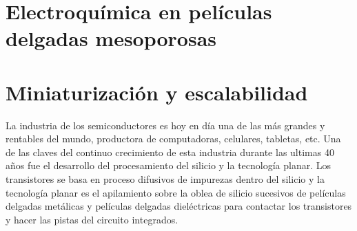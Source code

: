\section{Electroquímica en películas delgadas mesoporosas}
	
\section{Miniaturización y escalabilidad}\label{sec:microfabricacion}\label{sec:intro_fotolito}
	



		La industria de los semiconductores es hoy en día una de las más grandes y rentables del mundo, productora de computadoras, celulares, tabletas, etc. Una de las claves del continuo crecimiento de esta industria durante las ultimas 40 años fue el desarrollo del procesamiento del silicio y la tecnología planar. Los transistores se basa en proceso difusivos de impurezas dentro del silicio y la tecnología planar es el apilamiento sobre la oblea de silicio sucesivos de películas delgadas metálicas y  películas delgadas dieléctricas para contactar los transistores y hacer las pistas del circuito integrados. 






